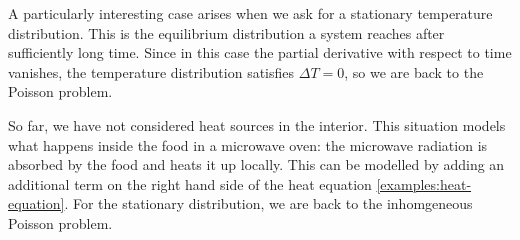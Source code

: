 A particularly interesting case arises when we ask for a stationary
temperature distribution.
This is the equilibrium distribution a system reaches after sufficiently
long time.
Since in this case the partial derivative with respect to time 
vanishes, the temperature distribution satisfies
$\Delta T=0$, so we are back to the Poisson problem.

So far, we have not considered heat sources in the interior.
This situation models what happens inside the food in a microwave oven: the
microwave radiation is absorbed by the food and heats it up locally.
This can be modelled by adding an additional term on the right hand
side of the heat equation \eqref{examples:heat-equation}.
For the stationary distribution, we are back to the inhomgeneous Poisson
problem.



